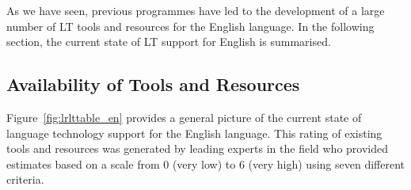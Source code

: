 \documentclass[]{../../metanetpaper}
\begin{document}
\begin{multicols}{2}
As we have seen, previous programmes have led to the development of a large number of LT tools and resources for the English language. In the following section, the current state of LT support for English is summarised.

\subsection{Availability of Tools and Resources}

Figure~\ref{fig:lrlttable_en} provides a general picture of the current state of language technology support for the English language. This rating of existing tools and resources was generated by leading experts in the field who provided estimates based on a scale from 0 (very low) to 6 (very high) using seven different criteria.



\end{multicols}
\end{document}
